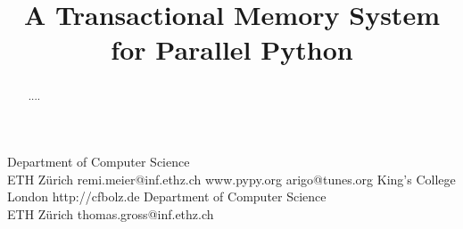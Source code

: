 \documentclass{sigplanconf}
\newcommand{\comment}[1]{}
\begin{document}
\setlength{\pdfpageheight}{\paperheight}
\setlength{\pdfpagewidth}{\paperwidth}






\title{A Transactional Memory System for Parallel Python}

\comment{
A Platform for Parallelism in Dynamic languages
Parallelism for Python
A TM Implementation for Python
Transactional Memory as a foundation for parallel Python
Transactional Memory as a foundation for parallelism in Python
Parallel Python based on VM-assisted TM
Parallel Python based on VM-assisted Transactional Memory
A Platform for parallel Python
A TM Platform for parallel Python
A Transactional Memory Platform for parallel Python
A Transactional Memory system for parallel Python

Virtual Memory Assisted Transactional Memory for Dynamic Languages}

           {Department of Computer Science\\ ETH Zürich}
           {remi.meier@inf.ethz.ch}
           {www.pypy.org}
           {arigo@tunes.org}
           {King's College London}
           {http://cfbolz.de}
           {Department of Computer Science\\ ETH Zürich}
           {thomas.gross@inf.ethz.ch}

\maketitle

\begin{abstract}
....
\end{abstract}
\end{document}
